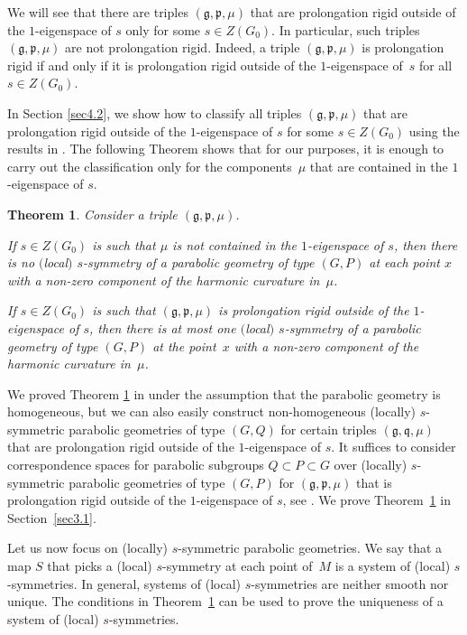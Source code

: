 \documentclass[pdftex]{sigma}
\newcommand{\fg}{\mathfrak g}
\newcommand{\fp}{\mathfrak p}
\newcommand{\fq}{\mathfrak q}
\numberwithin{equation}{section}
\newtheorem{Theorem}{Theorem}[section]
\begin{document}
We will see that there are triples $(\fg,\fp,\mu)$ that are prolongation rigid outside of the $1$-eigenspace of $s$ only for some $s\in Z(G_0)$. In particular, such triples $(\fg,\fp,\mu)$ are not prolongation rigid. Indeed, a triple $(\fg,\fp,\mu)$ is prolongation rigid if and only if it is prolongation rigid outside of the $1$-eigenspace of~$s$ for all $s\in Z(G_0)$.

In Section \ref{sec4.2}, we show how to classify all triples $(\fg,\fp,\mu)$ that are prolongation rigid outside of the $1$-eigenspace of $s$ for some $s\in Z(G_0)$ using the results in \cite{KT}. The following Theorem shows that for our purposes, it is enough to carry out the classif\/ication only for the compo\-nents~$\mu$ that are contained in the $1$-eigenspace of $s$.

\begin{Theorem}\label{t1.2}
Consider a triple $(\fg,\fp,\mu)$.

If $s\in Z(G_0)$ is such that $\mu$ is not contained in the $1$-eigenspace of $s$, then there is no $($local$)$ $s$-symmetry of a parabolic geometry of type $(G,P)$ at each point $x$ with a non-zero component of the harmonic curvature in~$\mu$.

If $s\in Z(G_0)$ is such that $(\fg,\fp,\mu)$ is prolongation rigid outside of the $1$-eigenspace of $s$, then there is at most one $($local$)$ $s$-symmetry of a parabolic geometry of type $(G,P)$ at the point~$x$ with a non-zero component of the harmonic curvature in~$\mu$.
\end{Theorem}

We proved Theorem \ref{t1.2} in \cite[Theorem 1.3]{GZ3} under the assumption that the parabolic geometry is homogeneous, but we can also easily construct non-homogeneous (locally) $s$-symmetric parabolic geometries of type $(G,Q)$ for certain triples $(\fg,\fq,\mu)$ that are prolongation rigid outside of the $1$-eigenspace of $s$. It suf\/f\/ices to consider correspondence spaces for parabolic subgroups $Q\subset P\subset G$ over (locally) $s$-symmetric parabolic geometries of type $(G,P)$ for $(\fg,\fp,\mu)$ that is prolongation rigid outside of the $1$-eigenspace of $s$, see \cite[Proposition 6.1]{GZ3}. We prove Theorem~\ref{t1.2} in Section~\ref{sec3.1}.

Let us now focus on (locally) $s$-symmetric parabolic geometries. We say that a map $S$ that picks a (local) $s$-symmetry at each point of~$M$ is a system of (local) $s$-symmetries. In general, systems of (local) $s$-symmetries are neither smooth nor unique. The conditions in Theorem~\ref{t1.2} can be used to prove the uniqueness of a system of (local) $s$-symmetries.
\end{document}
